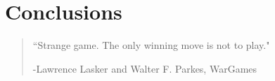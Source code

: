 \chapter{Conclusions}
\label{chap:Conclusions}



\begin{quotation}

    \begin{flushright}
    \begin{minipage}[t][5cm][b]{0.5\textwidth}
    { ``Strange game. The only winning move is not to play."}
    
    \bigskip
    
    -{\small  Lawrence Lasker and Walter F. Parkes, WarGames}
    \end{minipage}
    \end{flushright}
    
    \vspace{0.5cm}
\end{quotation}
